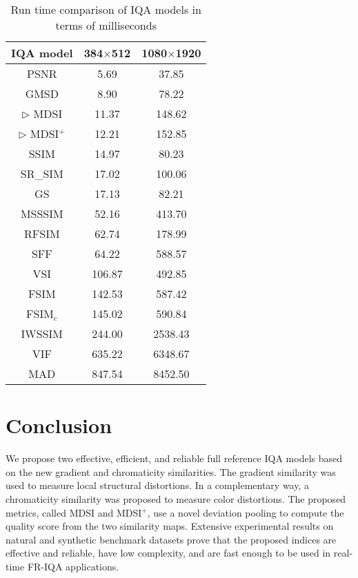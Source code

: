 \begin{table}[htb]
\centering
\caption{Run time comparison of IQA models in terms of milliseconds}
\begin{tabular}{ccc}
\hline
IQA model                    & 384$\times$512 & 1080$\times$1920 \\ \hline
{PSNR}    & 5.69 & 37.85                       \\
{GMSD} \cite{GMSD}    & 8.90 & 78.22                      \\
$\rhd$ {MDSI}    & 11.37 & 148.62                      \\
$\rhd$ {MDSI$^+$}    & 12.21 & 152.85                       \\
{SSIM} \cite{SSIM}    & 14.97 & 80.23                       \\
{SR\_SIM} \cite{SRSIM} & 17.02 & 100.06                       \\
{GS} \cite{GS}      & 17.13 & 82.21                       \\
{MSSSIM} \cite{MSSSIM}  & 52.16 & 413.70                       \\
{RFSIM} \cite{RFSIM}   & 62.74 & 178.99                       \\
{SFF} \cite{SFF}    & 64.22 & 588.57                       \\
{VSI} \cite{VSI}    & 106.87 & 492.85                      \\
{FSIM} \cite{FSIM}   & 142.53 & 587.42                     \\
{FSIM$_c$} \cite{FSIM}   & 145.02 & 590.84                     \\
{IWSSIM} \cite{IWSSIM} & 244.00 & 2538.43                      \\
{VIF} \cite{VIF}    & 635.22 & 6348.67                      \\
{MAD} \cite{MAD}    & 847.54 & 8452.50                     \\
\hline   
\end{tabular}
\label{time}
\end{table}



\afterpage{\clearpage}


\section{Conclusion}
\label{conclusion}

We propose two effective, efficient, and reliable full reference IQA models based on the new gradient and chromaticity similarities. The gradient similarity was used to measure local structural distortions. In a complementary way, a chromaticity similarity was proposed to measure color distortions. The proposed metrics, called MDSI and MDSI$^+$, use a novel deviation pooling to compute the quality score from the two similarity maps. Extensive experimental results on natural and synthetic benchmark datasets prove that the proposed indices are effective and reliable, have low complexity, and are fast enough to be used in real-time FR-IQA applications.  





